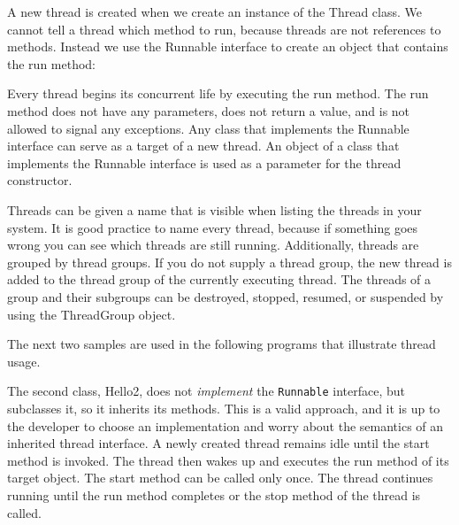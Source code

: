 {A new thread is created when we create an instance of the Thread class. We cannot tell a thread which method to run, because threads are not references to methods. Instead we use the Runnable interface to create an object that contains the run method:

Every thread begins its concurrent life by executing the run method. The run method does not have any parameters, does not return a value, and is not allowed to signal any exceptions.
Any class that implements the Runnable interface can serve as a target of a new thread. An object of a class that implements the Runnable interface is used as a parameter for the thread constructor.

Threads can be given a name that is visible when listing the threads in your system. It is good practice to name every thread, because if something goes wrong you can see which threads are still running.
Additionally, threads are grouped by thread groups. If you do not
supply a thread group, the new thread is added to the thread group of
the currently executing thread. The threads of a group and their
subgroups can be destroyed, stopped, resumed, or suspended by using
the ThreadGroup object. 

The next two samples are used in the following programs that
illustrate thread usage.
 
 
The second class, Hello2, does not \emph{implement} the
\texttt{Runnable} interface, but subclasses it, so it inherits its
methods. This is a valid approach, and it is up to the developer to
choose an implementation and worry about the semantics of an inherited
thread interface.
A newly created thread remains idle until the start method is invoked. The thread then wakes up and executes the run method of its target object. The start method can be called only once. The thread continues running until the run method completes or the stop method of the thread is called.





}
